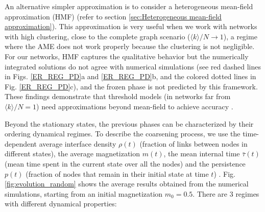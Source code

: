 An alternative simpler approximation is to consider a heterogeneous mean-field approximation (HMF) (refer to section \ref{sec:Heterogeneous mean-field approximation}). This approximation is very useful when we work with networks with high clustering, close to the complete graph scenario ($\langle k \rangle /N \to 1$), a regime where the AME does not work properly because the clustering is not negligible. For our networks, HMF captures the qualitative behavior but the numerically integrated solutions do not agree with numerical simulations (see red dashed lines in Figs. \ref{ER_REG_PD}a and \ref{ER_REG_PD}b, and the colored dotted lines in Fig. \ref{ER_REG_PD}c), and the frozen phase is not predicted by this framework. These findings demonstrate that threshold models (in networks far from $\langle k \rangle/N = 1$) need approximations beyond mean-field to achieve accuracy \cite{gleeson-2007,gleeson-2013}.

Beyond the stationary states, the previous phases can be characterized by their ordering dynamical regimes. To describe the coarsening process, we use the time-dependent average interface density $\rho(t)$ (fraction of links between nodes in different states), the average magnetization $m(t)$, the mean internal time $\bar{\tau}(t)$ (mean time spent in the current state over all the nodes) and the persistence $p(t)$ (fraction of nodes that remain in their initial state at time $t$) \cite{ben-naim-1996}. Fig. \ref{fig:evolution_random} shows the average results obtained from the numerical simulations, starting from an initial magnetization $m_0 = 0.5$. There are 3 regimes with different dynamical properties:

